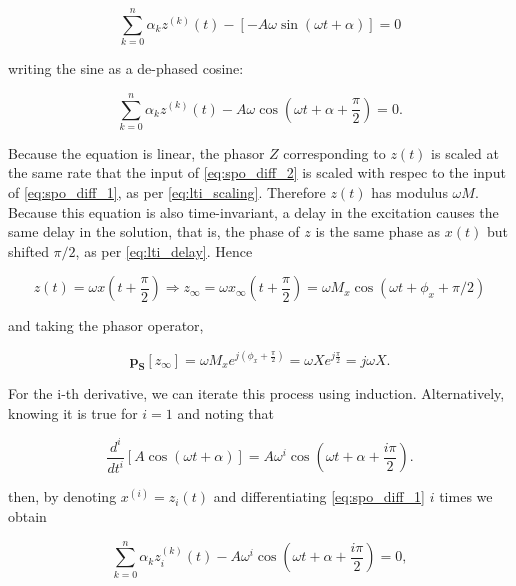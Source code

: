 \begin{equation} \sum\limits_{k=0}^n \alpha_k z^{(k)}(t) - \left[- A\omega\sin\left(\omega t + \alpha\right)\right] = 0 \end{equation}

	\noindent writing the sine as a de-phased cosine:

\begin{equation} \sum\limits_{k=0}^n \alpha_k z^{(k)}(t) - A\omega\cos\left(\omega t + \alpha + \dfrac{\pi}{2}\right) = 0. \label{eq:spo_diff_2}\end{equation}

	Because the equation is linear, the phasor $Z$ corresponding to $z(t)$ is scaled at the same rate that the input of \eqref{eq:spo_diff_2} is scaled with respec to the input of \eqref{eq:spo_diff_1}, as per \eqref{eq:lti_scaling}. Therefore $z(t)$ has modulus $\omega M$. Because this equation is also time-invariant, a delay in the excitation causes the same delay in the solution, that is, the phase of $z$ is the same phase as $x(t)$ but shifted $\pi/2$, as per \eqref{eq:lti_delay}. Hence  

\begin{equation} z(t) = \omega x\left(t + \dfrac{\pi}{2}\right) \Rightarrow z_\infty = \omega x_\infty \left(t + \dfrac{\pi}{2}\right) = \omega M_x \cos\left(\omega t + \phi_x + \pi/2\right)\end{equation}

	\noindent and taking the phasor operator,

\begin{equation} \mathbf{p_S}\left[z_\infty\right] = \omega M_x e^{j\left(\phi_x + \frac{\pi}{2}\right)} = \omega Xe^{j\frac{\pi}{2}} = j\omega X . \end{equation}

	For the i-th derivative, we can iterate this process using induction. Alternatively, knowing it is true for $i=1$ and noting that

\begin{equation} \dfrac{d^i}{dt^i}\left[A\cos\left(\omega t + \alpha\right)\right] = A\omega^i\cos\left(\omega t + \alpha + \dfrac{i\pi}{2}\right) .\end{equation}

	\noindent then, by denoting $x^{(i)} = z_i(t)$ and differentiating \eqref{eq:spo_diff_1} $i$ times we obtain

\begin{equation} \sum\limits_{k=0}^n \alpha_k z_i^{(k)}(t) - A\omega^i\cos\left(\omega t + \alpha + \dfrac{i\pi}{2}\right) = 0 , \label{eq:spo_diff_i}\end{equation}

